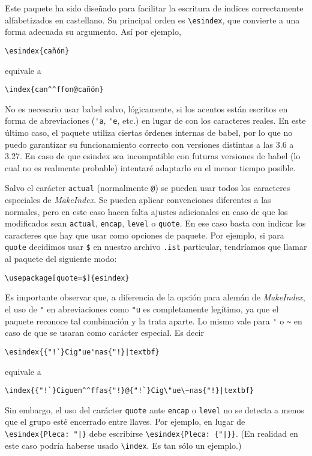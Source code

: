 \documentclass[a4paper]{ltxguide}
\begin{document}
Este paquete ha sido diseñado para facilitar la escritura de índices
correctamente alfabetizados en castellano. Su principal orden es
\verb|\esindex|, que convierte a una forma adecuada su argumento. Así
por ejemplo,
\begin{verbatim}
\esindex{cañón}
\end{verbatim}
equivale a
\begin{verbatim}
\index{can^^ffon@cañón}
\end{verbatim}
No es necesario usar \textsf{babel} salvo, lógicamente, si los acentos
están escritos en forma de abreviaciones (\verb|'a|, \verb|'e|, etc.)
en lugar de con los caracteres reales. En este último caso, el paquete
utiliza ciertas órdenes internas de \textsf{babel}, por lo que no puedo
garantizar su funcionamiento correcto con versiones distintas a las 3.6
a 3.27. En caso de que \textsf{esindex} sea incompatible con futuras
versiones de \textsf{babel} (lo cual no es realmente probable)
intentaré adaptarlo en el menor tiempo posible.

Salvo el carácter \verb|actual| (normalmente \verb|@|) se pueden usar
todos los caracteres especiales de \textit{MakeIndex}. Se pueden
aplicar convenciones diferentes a las normales, pero en este caso hacen
falta ajustes adicionales en caso de que los modificados sean
\verb|actual|, \verb|encap|, \verb|level| o \verb|quote|. En ese caso
basta con indicar los caracteres que hay que usar como opciones de
paquete. Por ejemplo, si para \verb|quote| decidimos usar \verb|$| en
nuestro archivo \verb|.ist| particular, tendríamos que llamar al
paquete del siguiente modo:
\begin{verbatim}
\usepackage[quote=$]{esindex}
\end{verbatim}

Es importante observar que, a diferencia de la opción para alemán de
\textit{MakeIndex}, el uso de \verb|"| en abreviaciones como \verb|"u|
es completamente legítimo, ya que el paquete reconoce tal combinación y
la trata aparte. Lo mismo vale para \verb|'| o \verb|~| en caso de que
se usaran como carácter especial. Es decir
\begin{verbatim}
\esindex{{"!`}Cig"ue'nas{"!}|textbf}
\end{verbatim}
equivale a
\begin{verbatim}
\index{{"!`}Ciguen^^ffas{"!}@{"!`}Cig\"ue\~nas{"!}|textbf}
\end{verbatim}

Sin embargo, el uso del carácter \verb|quote| ante \verb|encap| o
\verb|level| no se detecta a menos que el grupo esté encerrado entre
llaves. Por ejemplo, en lugar de \verb/\esindex{Pleca: "|}/ debe
escribirse \verb/\esindex{Pleca: {"|}}/. (En realidad en este caso
podría haberse usado \verb|\index|. Es tan sólo un ejemplo.)
\end{document}

